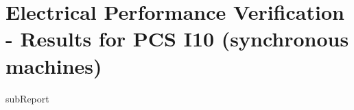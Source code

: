 \renewcommand{\DTRPcs}{I10SM} %
\renewcommand{\DTRPcsLong}{I10 (synchronous machines)}


    \section{Electrical Performance Verification - Results for PCS \DTRPcsLong}

    {{subReport}}
    \newpage

